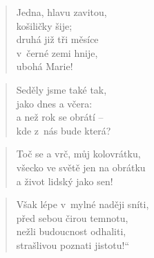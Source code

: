 \begin{verse}
Jedna, hlavu zavitou, \\
košiličky šije; \\
druhá již tři měsíce \\
v~černé zemi hnije, \\
ubohá Marie!
\end{verse}

\begin{verse}
Seděly jsme také tak, \\
jako dnes a včera: \\
a než rok se obrátí -- \\
kde z~nás bude která?
\end{verse}

\begin{verse}
Toč se a vrč, můj kolovrátku, \\
všecko ve světě jen na obrátku \\
a život lidský jako sen!
\end{verse}

\begin{verse}
Však lépe v~mylné naději sníti, \\
před sebou čirou temnotu, \\
nežli budoucnost odhaliti, \\
strašlivou poznati jistotu!“\\
\end{verse}
